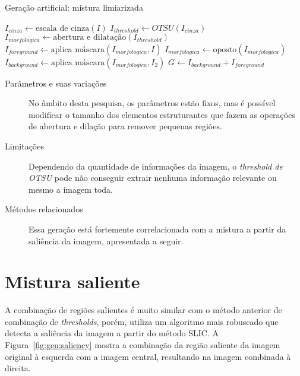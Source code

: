 \vspace{0.5cm}
\begin{algorithm}[!htbp]
  \caption{Geração artificial: mistura limiarizada}
  \label{alg:threshold}
  \SetAlgoLined

  $I_{cinza} \gets \text{escala de cinza}(I)$\;
  $I_{threshold} \gets OTSU(I_{cinza})$\;
  $I_{morfologica} \gets \text{abertura e dilatação} (I_{threshold})$\;
  $I_{foreground} \gets \text{aplica máscara}(I_{morfologica}, I) $\;
  $I_{morfologica} \gets \text{oposto}(I_{morfologica})$\;
  $I_{background} \gets \text{aplica máscara}(I_{morfologica}, I_2) $\;
  $G \gets I_{background} + I_{foreground}$\;
\end{algorithm}
\vspace{0.5cm}

\begin{description}
  \item[Parâmetros e suas variações] No âmbito desta pesquisa, os parâmetros estão fixos, mas é possível modificar o tamanho dos elementos estruturantes que fazem as operações de abertura e dilação para remover pequenas regiões.

  \item[Limitações] Dependendo da quantidade de informações da imagem, o \textit{threshold de OTSU} pode não conseguir extrair nenhuma informação relevante ou mesmo a imagem toda.

  \item[Métodos relacionados] Essa geração está fortemente correlacionada com a mistura a partir da saliência da imagem, apresentada a seguir.

\end{description}
\section{Mistura saliente}

A combinação de regiões salientes é muito similar com o método anterior de combinação de \textit{thresholds}, porém, utiliza um algoritmo mais robuscado que detecta a saliência da imagem a partir do método SLIC. A Figura~\ref{fig:gen:saliency} mostra a combinação da região saliente da imagem original à esquerda com a imagem central, resultando na imagem combinada à direita.

